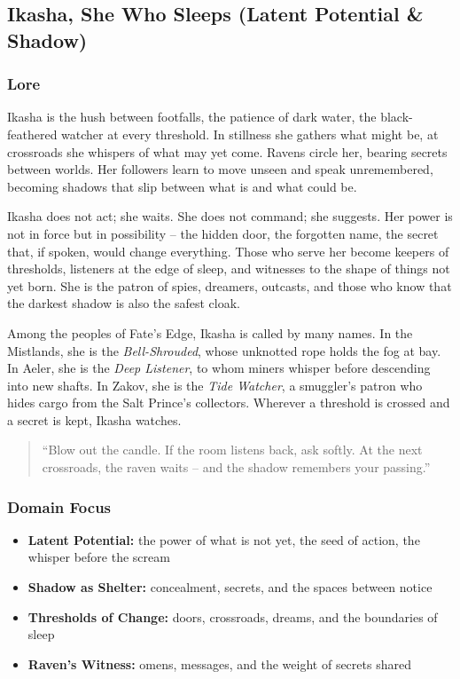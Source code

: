 
\subsection{Ikasha, She Who Sleeps (Latent Potential \& Shadow)}

\subsubsection*{Lore}
Ikasha is the hush between footfalls, the patience of dark water, the black-feathered watcher at every threshold. In stillness she gathers what might be, at crossroads she whispers of what may yet come. Ravens circle her, bearing secrets between worlds. Her followers learn to move unseen and speak unremembered, becoming shadows that slip between what is and what could be.

Ikasha does not act; she waits. She does not command; she suggests. Her power is not in force but in possibility -- the hidden door, the forgotten name, the secret that, if spoken, would change everything. Those who serve her become keepers of thresholds, listeners at the edge of sleep, and witnesses to the shape of things not yet born. She is the patron of spies, dreamers, outcasts, and those who know that the darkest shadow is also the safest cloak.

Among the peoples of Fate's Edge, Ikasha is called by many names. In the Mistlands, she is the \textit{Bell-Shrouded}, whose unknotted rope holds the fog at bay. In Aeler, she is the \textit{Deep Listener}, to whom miners whisper before descending into new shafts. In Zakov, she is the \textit{Tide Watcher}, a smuggler's patron who hides cargo from the Salt Prince's collectors. Wherever a threshold is crossed and a secret is kept, Ikasha watches.

\begin{quote}
``Blow out the candle. If the room listens back, ask softly. At the next crossroads, the raven waits -- and the shadow remembers your passing.''
\end{quote}

\subsubsection*{Domain Focus}
\begin{itemize}
  \item \textbf{Latent Potential:} the power of what is not yet, the seed of action, the whisper before the scream
  \item \textbf{Shadow as Shelter:} concealment, secrets, and the spaces between notice
  \item \textbf{Thresholds of Change:} doors, crossroads, dreams, and the boundaries of sleep
  \item \textbf{Raven's Witness:} omens, messages, and the weight of secrets shared
\end{itemize}

